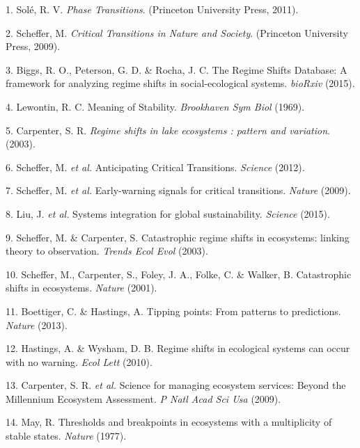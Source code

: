 \documentclass[9pt,]{article}
\begin{document}
\pagebreak

\hypertarget{refs}{}
\hypertarget{ref-Sole:2011us}{}
1. Solé, R. V. \emph{Phase Transitions}. (Princeton University Press,
2011).

\hypertarget{ref-Scheffer:2009wl}{}
2. Scheffer, M. \emph{Critical Transitions in Nature and Society}.
(Princeton University Press, 2009).

\hypertarget{ref-Biggs:2015iha}{}
3. Biggs, R. O., Peterson, G. D. \& Rocha, J. C. The Regime Shifts
Database: A framework for analyzing regime shifts in social-ecological
systems. \emph{bioRxiv} (2015).

\hypertarget{ref-Lewontin:1969vh}{}
4. Lewontin, R. C. Meaning of Stability. \emph{Brookhaven Sym Biol}
(1969).

\hypertarget{ref-Carpenter2003rsi}{}
5. Carpenter, S. R. \emph{Regime shifts in lake ecosystems : pattern and
variation}. (2003).

\hypertarget{ref-Scheffer:2012cta}{}
6. Scheffer, M. \emph{et al.} Anticipating Critical Transitions.
\emph{Science} (2012).

\hypertarget{ref-Scheffer:2009p4449}{}
7. Scheffer, M. \emph{et al.} Early-warning signals for critical
transitions. \emph{Nature} (2009).

\hypertarget{ref-Liu:2015go}{}
8. Liu, J. \emph{et al.} Systems integration for global sustainability.
\emph{Science} (2015).

\hypertarget{ref-Scheffer:2003p339}{}
9. Scheffer, M. \& Carpenter, S. Catastrophic regime shifts in
ecosystems: linking theory to observation. \emph{Trends Ecol Evol}
(2003).

\hypertarget{ref-Scheffer:2001uu}{}
10. Scheffer, M., Carpenter, S., Foley, J. A., Folke, C. \& Walker, B.
Catastrophic shifts in ecosystems. \emph{Nature} (2001).

\hypertarget{ref-Boettiger:2013bm}{}
11. Boettiger, C. \& Hastings, A. Tipping points: From patterns to
predictions. \emph{Nature} (2013).

\hypertarget{ref-Hastings:2010p5336}{}
12. Hastings, A. \& Wysham, D. B. Regime shifts in ecological systems
can occur with no warning. \emph{Ecol Lett} (2010).

\hypertarget{ref-Carpenter:2009jr}{}
13. Carpenter, S. R. \emph{et al.} Science for managing ecosystem
services: Beyond the Millennium Ecosystem Assessment. \emph{P Natl Acad
Sci Usa} (2009).

\hypertarget{ref-MAY:1977p3426}{}
14. May, R. Thresholds and breakpoints in ecosystems with a multiplicity
of stable states. \emph{Nature} (1977).
\end{document}
